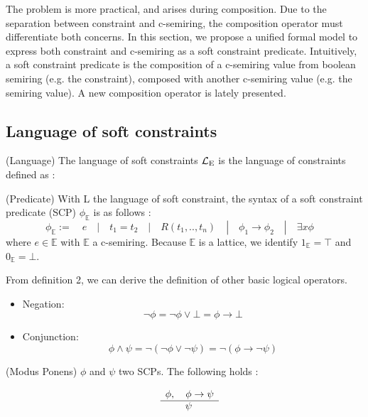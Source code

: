 \documentclass[runningheads]{llncs}
\newcommand{\lsc}{{\cal L}_{\rm E}}
\begin{document}
The problem is more practical, and arises during composition. Due to the separation between constraint and c-semiring, the composition operator must differentiate both concerns. In this section, we propose a unified formal model to express both constraint and c-semiring as a soft constraint predicate. Intuitively, a soft constraint predicate is the composition of a c-semiring value from boolean semiring (e.g. the constraint), composed with another c-semiring value (e.g. the semiring value). A new composition operator is lately presented. 

\subsection{Language of soft constraints}
\label{sec:lang}
\begin{definition}{(Language)}
 The language of soft constraints $\lsc$ is the language of constraints defined as : 
\end{definition}

\begin{definition}{(Predicate)}
	With L the language of soft constraint, the syntax of a soft constraint predicate (SCP) $\phi_{\mathbb{E}}$ is as follows : 
	$$\phi_{\mathbb{E}}:= \quad e \quad | \quad t_1=t_2 \quad |\quad R(t_1, .. ,t_n) \quad | \quad \phi_1 \rightarrow \phi_2 \quad | \quad \exists x \phi \quad  $$ where $e \in \mathbb{E}$ with $\mathbb{E}$ a c-semiring. Because $\mathbb{E}$ is a lattice, we identify $1_\mathbb{E}=\top$ and $0_\mathbb{E}=\bot$.
\end{definition}

From definition 2, we can derive the definition of other basic logical operators.
\begin{itemize}
    \item Negation:  $$\neg \phi = \neg \phi \lor \bot = \phi \rightarrow \bot $$
    \item Conjunction: $$\phi \land \psi = \neg (\neg \phi \lor \neg \psi) = \neg (\phi \rightarrow \neg \psi) $$
\end{itemize}


\begin{definition}{(Modus Ponens)}
$\phi$ and $\psi$ two SCPs. The following holds :

$$\begin{array}{rl}
    & \phi, \quad \phi \to \psi \\
    \cline{2-2}
    & \quad \quad \psi
  \end{array}$$
\end{definition}
\end{document}
